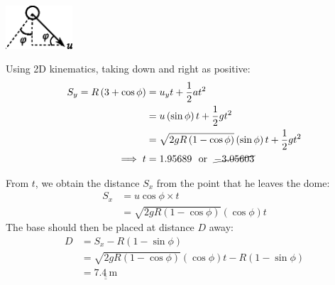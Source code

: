 \documentclass[answers]{exam}
\def\doubleunderline#1{\underline{\underline{#1}}}
\begin{document}
\begin{questions}
{\begin{solutionorbox}[115mm]
\begin{enumerate}[label={[\arabic*]}]
			\begin{minipage}{3cm} 
				\hspace{0.7cm}
				\includegraphics[width=2.5cm]{daredevil2.eps}
			\end{minipage}
			\begin{minipage}{\linewidth - 3cm}
				Using 2D kinematics, taking down and right as positive:
				\begin{align*}
				S_y = R\left(3 + \cos\phi\right) &= u_yt + \frac{1}{2} at^2 \\ 
				&= u\left(\sin\phi\right)t + \frac{1}{2} gt^2 \\
				&= \sqrt{2gR\left(1-\cos\phi\right)}\left(\sin\phi\right)t + \frac{1}{2} gt^2 \\
				\implies t &= 1.95689 \text{~~or~~} \cancel{-3.05603}
				\end{align*}
			\end{minipage}
			From $t$, we obtain the distance $S_x$ from the point that he leaves the dome:
			\begin{align*}
				S_x &= u\cos\phi \times t \\
				&= \sqrt{2gR\left(1-\cos\phi\right)}\left(\cos\phi\right)t
			\end{align*}
			The base should then be placed at distance $D$ away:
			\begin{align*}
				D &= S_x - R(1-\sin\phi) \\
				&= \sqrt{2gR\left(1-\cos\phi\right)}\left(\cos\phi\right)t - R(1-\sin\phi) \\
				&= \doubleunderline{\SI{7.4}{\meter}}
			\end{align*}
	\end{enumerate}
\end{solutionorbox}
}

\end{questions}
\end{document}
